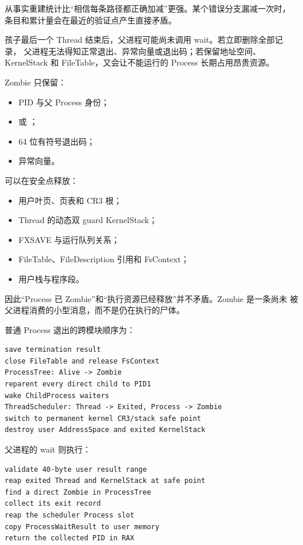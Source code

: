 从事实重建统计比“相信每条路径都正确加减”更强。某个错误分支漏减一次时，
条目和累计量会在最近的验证点产生直接矛盾。

孩子最后一个 Thread 结束后，父进程可能尚未调用 wait。若立即删除全部记录，
父进程无法得知正常退出、异常向量或退出码；若保留地址空间、KernelStack 和
FileTable，又会让不能运行的 Process 长期占用昂贵资源。

Zombie 只保留：

\begin{itemize}
  \item PID 与父 Process 身份；
  \item {} 或 ；
  \item 64 位有符号退出码；
  \item 异常向量。
\end{itemize}

可以在安全点释放：

\begin{itemize}
  \item 用户叶页、页表和 CR3 根；
  \item Thread 的动态双 guard KernelStack；
  \item FXSAVE 与运行队列关系；
  \item FileTable、FileDescription 引用和 FsContext；
  \item 用户栈与程序段。
\end{itemize}

因此“Process 已 Zombie”和“执行资源已经释放”并不矛盾。Zombie 是一条尚未
被父进程消费的小型消息，而不是仍在执行的尸体。

普通 Process 退出的跨模块顺序为：

\begin{lstlisting}[caption={退出路径的所有权顺序}]
save termination result
close FileTable and release FsContext
ProcessTree: Alive -> Zombie
reparent every direct child to PID1
wake ChildProcess waiters
ThreadScheduler: Thread -> Exited, Process -> Zombie
switch to permanent kernel CR3/stack safe point
destroy user AddressSpace and exited KernelStack
\end{lstlisting}

父进程的 wait 则执行：

\begin{lstlisting}[caption={wait 不能先消费再验证用户指针}]
validate 40-byte user result range
reap exited Thread and KernelStack at safe point
find a direct Zombie in ProcessTree
collect its exit record
reap the scheduler Process slot
copy ProcessWaitResult to user memory
return the collected PID in RAX
\end{lstlisting}

